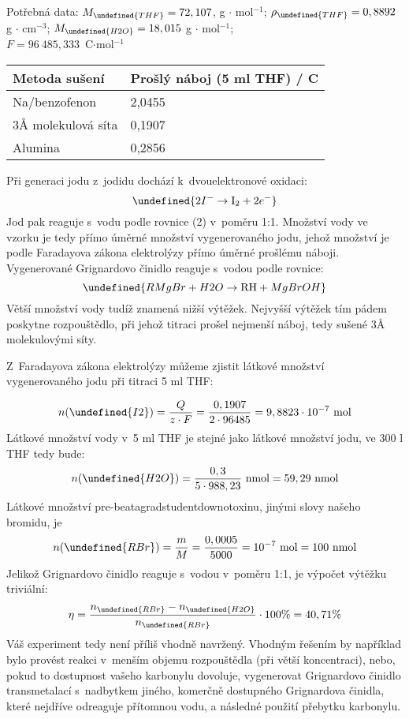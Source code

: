 \documentclass{book}
\let\ch\undefined
\renewenvironment{quotation}{\par}{\par} %
\begin{document}
\begin{quotation}
Potřebná data: $M_{\ch{THF}}=72,107$, g $\cdot$ mol$^{-1}$;  $\rho_{\ch{THF}}=0,8892$ g $\cdot$ cm$^{-3}$; $M_{\ch{H2O}}=18,015$ g $\cdot$ mol$^{-1}$; \\ $F=96~485,333$~C$\cdot$mol$^{-1}$
\vspace{3mm}
\begin{center}
\begin{tabular}{l|l}
Metoda sušení & Prošlý náboj (5 ml THF) / C\tabularnewline\hline\hline
Na/benzofenon & 2,0455\tabularnewline\hline
3Å molekulová síta & 0,1907\tabularnewline\hline
Alumina & 0,2856
\end{tabular}
\par\end{center}

\end{quotation} \dotfill \par 
Při generaci jodu z~jodidu dochází k~dvouelektronové oxidaci: 
\[
\ch{2 I^{-} \rightarrow \mathrm{I_{2}} + 2 e^{-}}
\]
Jod pak reaguje s~vodu podle rovnice (2) v~poměru 1:1. Množství
vody ve vzorku je tedy přímo úměrné množství vygenerovaného jodu,
jehož množství je podle Faradayova zákona elektrolýzy přímo úměrné
prošlému náboji. Vygenerované Grignardovo činidlo reaguje s~vodou
podle rovnice: 
\[
\ch{RMgBr + H2O \rightarrow \mathrm{RH} + MgBrOH}
\]
Větší množství vody tudíž znamená nižší výtěžek. Nejvyšší výtěžek
tím pádem poskytne rozpouštědlo, při jehož titraci prošel nejmenší
náboj, tedy sušené 3Å molekulovými síty.

Z~Faradayova zákona elektrolýzy můžeme zjistit látkové množství vygenerovaného
jodu při titraci 5 ml THF:

\[
n(\ch{I2})=\frac{Q}{z\cdot F}=\frac{0,1907}{2\cdot96485}=9,8823\cdot10^{-7}\mathrm{~mol}
\]
Látkové množství vody v~5 ml THF je stejné jako látkové množství
jodu, ve 300 \textmu l THF tedy bude: 
\[
n(\ch{H2O})=\frac{0,3}{5\cdot988,23}\mathrm{~nmol}=59,29\mathrm{~nmol}
\]
Látkové množství pre-beatagradstudentdownotoxinu, jinými slovy našeho
bromidu, je 
\[
n(\ch{RBr})=\frac{m}{M}=\frac{0,0005}{5000}=10^{-7}\mathrm{~mol}=100\mathrm{~nmol}
\]
Jelikož Grignardovo činidlo reaguje s~vodou v~poměru 1:1, je výpočet
výtěžku triviální: 
\[
\eta=\frac{n_{\ch{RBr}}-n_{\ch{H2O}}}{n_{\ch{RBr}}}\cdot100\%=40,71\%
\]
Váš experiment tedy není příliš vhodně navržený. Vhodným řešením by
například bylo provést reakci v~menším objemu rozpouštědla (při větší
koncentraci), nebo, pokud to dostupnost vašeho karbonylu dovoluje,
vygenerovat Grignardovo činidlo transmetalací s~nadbytkem jiného,
komerčně dostupného Grignardova činidla, které nejdříve odreaguje
přítomnou vodu, a následné použití přebytku karbonylu.
\end{document}
